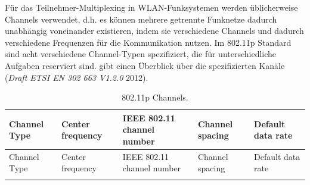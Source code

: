 \documentclass[ngerman,]{scrartcl}
\begin{document}
Für das Teilnehmer-Multiplexing in WLAN-Funksystemen werden
üblicherweise Channels verwendet, d.h. es können mehrere getrennte
Funknetze dadurch unabhängig voneinander existieren, indem sie
verschiedene Channels und dadurch verschiedene Frequenzen für die
Kommunikation nutzen. Im 802.11p Standard sind acht verschiedene
Channel-Typen spezifiziert, die für unterschiedliche Aufgaben reserviert
sind.  gibt einen Überblick über die
spezifizierten Kanäle (\emph{Draft ETSI EN 302 663 V1.2.0} 2012).

\begin{longtable}[]{@{}lllll@{}}
\caption{802.11p Channels. \label{tbl:channels}}\tabularnewline
\toprule
\begin{minipage}[b]{0.08\columnwidth}\raggedright\strut
Channel Type\strut
\end{minipage} & \begin{minipage}[b]{0.30\columnwidth}\raggedright\strut
Center frequency\strut
\end{minipage} & \begin{minipage}[b]{0.16\columnwidth}\raggedright\strut
IEEE 802.11 channel number\strut
\end{minipage} & \begin{minipage}[b]{0.14\columnwidth}\raggedright\strut
Channel spacing\strut
\end{minipage} & \begin{minipage}[b]{0.18\columnwidth}\raggedright\strut
Default data rate\strut
\end{minipage}\tabularnewline
\midrule
\endfirsthead
\toprule
\begin{minipage}[b]{0.08\columnwidth}\raggedright\strut
Channel Type\strut
\end{minipage} & \begin{minipage}[b]{0.30\columnwidth}\raggedright\strut
Center frequency\strut
\end{minipage} & \begin{minipage}[b]{0.16\columnwidth}\raggedright\strut
IEEE 802.11 channel number\strut
\end{minipage} & \begin{minipage}[b]{0.14\columnwidth}\raggedright\strut
Channel spacing\strut
\end{minipage} & \begin{minipage}[b]{0.18\columnwidth}\raggedright\strut
Default data rate\strut
\end{minipage}\tabularnewline
\midrule
\endhead
\begin{minipage}[t]{0.08\columnwidth}\raggedright\strut

\end{minipage}
\end{longtable}
\end{document}
